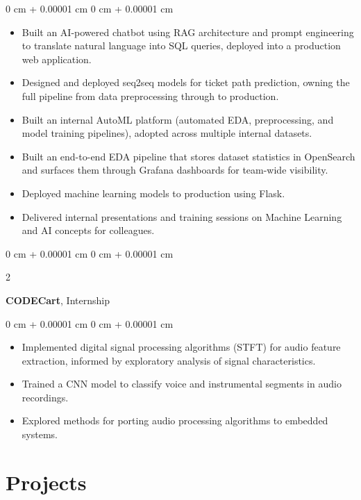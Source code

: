\documentclass[10pt, letterpaper]{article}
\newenvironment{highlights}{
    \begin{itemize}[
        topsep=0.10 cm,
        parsep=0.10 cm,
        partopsep=0pt,
        itemsep=0pt,
        leftmargin=0 cm + 10pt
    ]
}{
    \end{itemize}
}
\newenvironment{onecolentry}{
    \begin{adjustwidth}{
        0 cm + 0.00001 cm
    }{
        0 cm + 0.00001 cm
    }
}{
    \end{adjustwidth}
}
\newenvironment{twocolentry}[2][]{
    \onecolentry
    \def\secondColumn{#2}
    \setcolumnwidth{\fill, 4.5 cm}
    \begin{paracol}{2}
}{
    \switchcolumn \raggedleft \secondColumn
    \end{paracol}
    \endonecolentry
}
\begin{document}
\vspace{0.10 cm}
\begin{onecolentry}
    \begin{highlights}
        \item Built an AI-powered chatbot using RAG architecture and prompt engineering to translate natural language into SQL queries, deployed into a production web application.
        \item Designed and deployed seq2seq models for ticket path prediction, owning the full pipeline from data preprocessing through to production.
        \item Built an internal AutoML platform (automated EDA, preprocessing, and model training pipelines), adopted across multiple internal datasets.
        \item Built an end-to-end EDA pipeline that stores dataset statistics in OpenSearch and surfaces them through Grafana dashboards for team-wide visibility.
        \item Deployed machine learning models to production using Flask.
        \item Delivered internal presentations and training sessions on Machine Learning and AI concepts for colleagues.
    \end{highlights}
\end{onecolentry}

\vspace{0.2 cm}

\begin{twocolentry}{
    2023
}
    \textbf{CODECart}, Internship
\end{twocolentry}

\vspace{0.10 cm}
\begin{onecolentry}
    \begin{highlights}
        \item Implemented digital signal processing algorithms (STFT) for audio feature extraction, informed by exploratory analysis of signal characteristics.
        \item Trained a CNN model to classify voice and instrumental segments in audio recordings.
        \item Explored methods for porting audio processing algorithms to embedded systems.
    \end{highlights}
\end{onecolentry}

\section{Projects}
\end{document}
